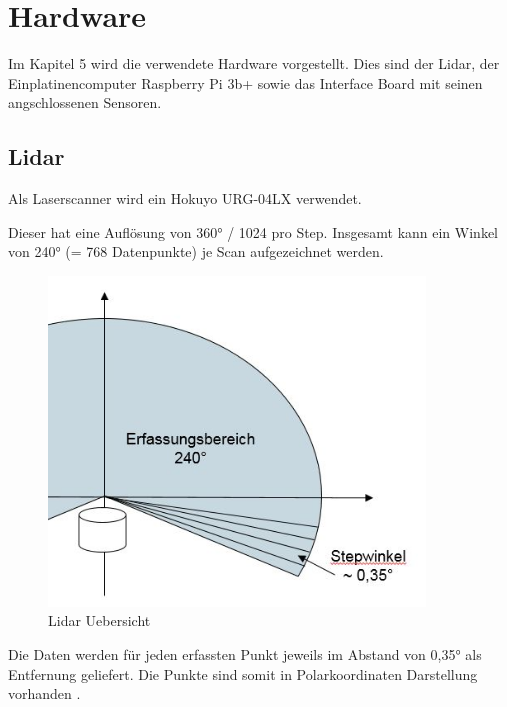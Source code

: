 \chapter{Hardware}

Im Kapitel 5 wird die verwendete Hardware vorgestellt. Dies sind der Lidar, der Einplatinencomputer Raspberry Pi 3b+ sowie das Interface Board mit seinen angschlossenen Sensoren. 

\section{Lidar}

Als Laserscanner wird ein Hokuyo URG-04LX verwendet.

Dieser hat eine Auflösung von 360° / 1024 pro Step. Insgesamt kann ein Winkel von 240° (= 768 Datenpunkte) je Scan aufgezeichnet werden.

\begin{figure}[h]
\begin{center}
\includegraphics[width=10cm]{images/chapter5/LidarHardware.jpg}
\caption{Lidar Uebersicht}
\label{Lidar_uebersicht}
\end{center}
\end{figure}

Die Daten werden für jeden erfassten Punkt jeweils im Abstand von 0,35° als Entfernung geliefert. Die Punkte sind somit in Polarkoordinaten Darstellung vorhanden \cite{hokuyo.2018}.

